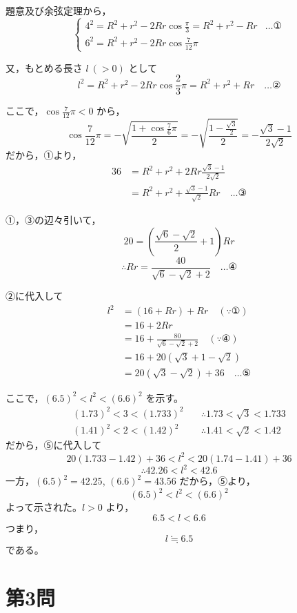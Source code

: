 \documentclass[../main.tex]{subfiles}
\begin{document}
題意及び余弦定理から，
\[
  \begin{cases}
    4^2 = R^2 + r^2 - 2Rr \cos \frac{\pi}{3} = R^2 + r^2 - Rr & \dots \text{①} \\
    6^2 = R^2 + r^2 - 2Rr \cos \frac{7}{12}\pi &
  \end{cases}
\]

又，もとめる長さ $l\ (>0)$ として
\[
  l^2 = R^2 + r^2 - 2Rr \cos \frac{2}{3}\pi = R^2 + r^2 + Rr \quad \dots \text{②}
\]

ここで，$\cos \frac{7}{12}\pi < 0$ から，
\[
  \cos \frac{7}{12}\pi = -\sqrt{\frac{1 + \cos \frac{7}{6}\pi}{2}} = -\sqrt{\frac{1 - \frac{\sqrt{3}}{2}}{2}} = -\frac{\sqrt{3}-1}{2\sqrt{2}}
\]
だから，①より，
\begin{align*}
  36 &= R^2 + r^2 + 2Rr \frac{\sqrt{3}-1}{2\sqrt{2}} \\
  &= R^2 + r^2 + \frac{\sqrt{3}-1}{\sqrt{2}} Rr \quad \dots \text{③}
\end{align*}

①，③の辺々引いて，
\[
  20 = \left( \frac{\sqrt{6}-\sqrt{2}}{2} + 1 \right) Rr
\]
\[
  \therefore Rr = \frac{40}{\sqrt{6}-\sqrt{2}+2} \quad \dots \text{④}
\]

②に代入して
\begin{align*}
  l^2 &= (16 + Rr) + Rr \quad (\because \text{①}) \\
  &= 16 + 2Rr \\
  &= 16 + \frac{80}{\sqrt{6}-\sqrt{2}+2} \quad (\because \text{④}) \\
  &= 16 + 20(\sqrt{3}+1-\sqrt{2}) \\
  &= 20(\sqrt{3}-\sqrt{2}) + 36 \quad \dots \text{⑤}
\end{align*}

ここで，$(6.5)^2 < l^2 < (6.6)^2$ を示す。
\begin{align*}
  (1.73)^2 < 3 < (1.733)^2 \quad &\therefore 1.73 < \sqrt{3} < 1.733 \\
  (1.41)^2 < 2 < (1.42)^2 \quad &\therefore 1.41 < \sqrt{2} < 1.42
\end{align*}
だから，⑤に代入して
\[
  20(1.733 - 1.42) + 36 < l^2 < 20(1.74 - 1.41) + 36
\]
\[
  \therefore 42.26 < l^2 < 42.6
\]
一方，$(6.5)^2 = 42.25$, $(6.6)^2 = 43.56$ だから，⑤より，
\[
  (6.5)^2 < l^2 < (6.6)^2
\]
よって示された。$l > 0$ より，
\[
  6.5 < l < 6.6
\]
つまり，
\[
  l \fallingdotseq 6.5
\]
である。

\newpage

\section*{第3問}
\end{document}
